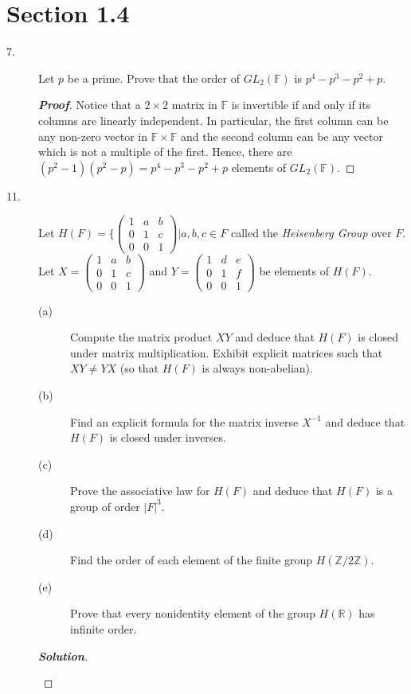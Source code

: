 \documentclass[12pt,leqno]{book}
\theoremstyle{definition}
\newcommand{\Z}{\mathbb{Z}}
\newcommand{\R}{\mathbb{R}}
\newcommand{\F}{\mathbb{F}}
\newenvironment{Proof}{\begin{proof}[\textnormal{\textbf{Proof}}]}{\end{proof}}
\newenvironment{Solution}{\begin{proof}[\textnormal{\textbf{Solution}}]}{\end{proof}}
\begin{document}
\section*{Section 1.4}
  \begin{description}
   \item [7.] Let $p$ be a prime. Prove that the order of $GL_2(\F)$ is $p^4-p^3-p^2+p$.
    \begin{Proof}
     Notice that a $2\times2$ matrix in $\F$ is invertible if and only if its columns are linearly independent. In particular, the first column can be any non-zero vector in $\F\times\F$ and the second column can be any vector which is not a multiple of the first. Hence, there are $(p^2-1)(p^2-p)=p^4-p^3-p^2+p$ elements of $GL_2(\F)$.
    \end{Proof}
   \item [11.] Let $H(F)=\{\begin{pmatrix}1&a&b\\0&1&c\\0&0&1\end{pmatrix}|a,b,c\in F$ called the \textit{Heisenberg Group} over $F$. Let $X=\begin{pmatrix}1&a&b\\0&1&c\\0&0&1\end{pmatrix}$ and $Y=\begin{pmatrix}1&d&e\\0&1&f\\0&0&1\end{pmatrix}$ be elements of $H(F)$. 
  \begin{description}
   \item [(a)] Compute the matrix product $XY$ and deduce that $H(F)$ is closed under matrix multiplication. Exhibit explicit matrices such that $XY\not=YX$ (so that $H(F)$ is always non-abelian).
   \item [(b)] Find an explicit formula for the matrix inverse $X^{-1}$ and deduce that $H(F)$ is closed under inverses. 
   \item [(c)] Prove the associative law for $H(F)$ and deduce that $H(F)$ is a group of order $|F|^3$.
   \item [(d)] Find the order of each element of the finite group $H(\Z/2\Z)$. 
   \item [(e)] Prove that every nonidentity element of the group $H(\R)$ has infinite order.
  \end{description}
  \begin{Solution}
   \begin{description}

\end{description}
\end{Solution}
\end{description}
\end{document}
